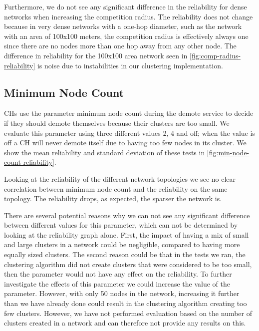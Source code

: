 Furthermore, we do not see any significant difference in the reliability for dense networks when increasing the competition radius. The reliability does not change because in very dense networks with a one-hop diameter, such as the network with an area of 100x100 meters, the competition radius is effectively always one since there are no nodes more than one hop away from any other node. The difference in reliability for the 100x100 area network seen in \cref{fig:comp-radius-reliability} is noise due to instabilities in our clustering implementation.

\subsection{Minimum Node Count}
CHs use the parameter minimum node count during the demote service to decide if they should demote themselves because their clusters are too small. We evaluate this parameter using three different values 2, 4 and off; when the value is off a CH will never demote itself due to having too few nodes in its cluster. We show the mean reliability and standard deviation of these tests in \cref{fig:min-node-count-reliability}.

Looking at the reliability of the different network topologies we see no clear correlation between minimum node count and the reliability on the same topology. The reliability drops, as expected, the sparser the network is.

There are several potential reasons why we can not see any significant difference between different values for this parameter, which can not be determined by looking at the reliability graph alone. First, the impact of having a mix of small and large clusters in a network could be negligible, compared to having more equally sized clusters. The second reason could be that in the tests we ran, the clustering algorithm did not create clusters that were considered to be too small, then the parameter would not have any effect on the reliability. To further investigate the effects of this parameter we could increase the value of the parameter. However, with only 50 nodes in the network, increasing it further than we have already done could result in the clustering algorithm creating too few clusters. However, we have not performed evaluation based on the number of clusters created in a network and can therefore not provide any results on this.



